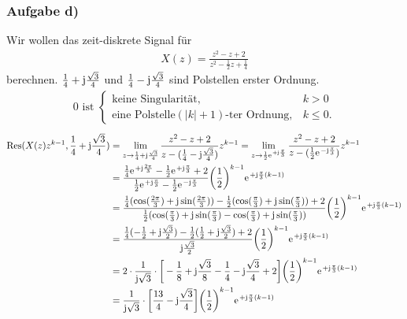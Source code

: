 \documentclass[11pt,a4paper,DIV=12]{scrartcl}
\begin{document}
\subsubsection{Aufgabe d)}
Wir wollen das zeit-diskrete Signal für
\begin{align}
	X(z)=\frac{z^2-z+2}{z^2-\frac{1}{2}z+\frac{1}{4}}
\end{align}
berechnen.
$\frac{1}{4}+\im\frac{\sqrt{3}}{4}$ und $\frac{1}{4}-\im\frac{\sqrt{3}}{4}$ sind Polstellen erster Ordnung.
\begin{align}
	0 \text{ ist }\begin{cases}
		\text{keine Singularität}, &k>0 \\
		\text{eine Polstelle} (|k|+1)\text{-ter Ordnung}, &k\leq 0.
	\end{cases}
\end{align}
\begin{align}
	\mathrm{Res}(X(z)z^{k-1},\frac{1}{4}+\im\frac{\sqrt{3}}{4})&=\lim\limits_{z\rightarrow\frac{1}{4}+\im\frac{\sqrt{3}}{4}}\frac{z^2-z+2}{z-(\frac{1}{4}-\im\frac{\sqrt{3}}{4})}z^{k-1}=\lim\limits_{z\rightarrow\frac{1}{2}\e^{+\im\frac{\pi}{3}}}\frac{z^2-z+2}{z-(\frac{1}{2}\e^{-\im\frac{\pi}{3}})}z^{k-1}\nonumber\\
	&=\frac{\frac{1}{4}\e^{+\im\frac{2\pi}{3}}-\frac{1}{2}\e^{+\im\frac{\pi}{3}}+2}{\frac{1}{2}\e^{+\im\frac{\pi}{3}}-\frac{1}{2}\e^{-\im\frac{\pi}{3}}}\bigg(\frac{1}{2}\bigg )^{k-1}\e^{+\im\frac{\pi}{3}(k-1)}\nonumber\\
	&=\frac{\frac{1}{4}(\cos(\frac{2\pi}{3})+\im\sin(\frac{2\pi}{3}))-\frac{1}{2}(\cos(\frac{\pi}{3})+\im\sin(\frac{\pi}{3}))+2}{\frac{1}{2}(\cos(\frac{\pi}{3})+\im\sin(\frac{\pi}{3})-\cos(\frac{\pi}{3})+\im\sin(\frac{\pi}{3}))}\bigg(\frac{1}{2}\bigg )^{k-1}\e^{+\im\frac{\pi}{3}(k-1)}\nonumber\\
	&=\frac{\frac{1}{4}(-\frac{1}{2}+\im\frac{\sqrt{3}}{2})-\frac{1}{2}(\frac{1}{2}+\im\frac{\sqrt{3}}{2})+2}{\im\frac{\sqrt{3}}{2}}\bigg(\frac{1}{2}\bigg )^{k-1}\e^{+\im\frac{\pi}{3}(k-1)}\nonumber\\
	&=2\cdot\frac{1}{\im\sqrt{3}}\cdot\bigg [-\frac{1}{8}+\im\frac{\sqrt{3}}{8}-\frac{1}{4}-\im\frac{\sqrt{3}}{4}+2\bigg]\bigg(\frac{1}{2}\bigg )^{k-1}\e^{+\im\frac{\pi}{3}(k-1)}\nonumber\\
	&=\frac{1}{\im\sqrt{3}}\cdot\bigg [\frac{13}{4}-\im\frac{\sqrt{3}}{4}\bigg]\bigg(\frac{1}{2}\bigg)^{k-1}\e^{+\im\frac{\pi}{3}(k-1)}
\end{align}
\end{document}
